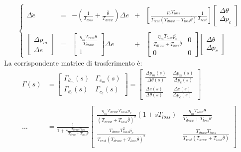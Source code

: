 $$
\left\{
\begin{array}{ccccc}
\Delta\dot{e}&=&-\left(\frac{1}{T_{loss}}+\frac{\overline{\theta}}{T_{draw}}\right)\Delta e&+&\left[\frac{p_c T_{loss}}{T_{rest}(T_{draw}+T_{loss}\overline{\theta})}\frac{1}{T_{rest}}\right]\left[\begin{array}
{c}
\Delta\theta\\
\Delta p_c
\end{array}\right]\\
\\
\left[
\begin{array}{c}
\Delta p_m\\
\Delta e
\end{array}\right] 
& = &
\left[
\begin{array}{c}
\frac{\eta_mT_{rest}\theta}{T_{draw}}\\
1
\end{array}\right]
\Delta e &+&
\left[ 
\begin{array}{cc}
\frac{\eta_mT_{loss}\overline{p_c}}{T_{draw}+T_{loss}\overline{\theta}} & 0 \\
0 & 0
\end{array}\right]\left[
\begin{array}{c}
\Delta\theta\\
\Delta p_c
\end{array}\right]
\end{array}
\right.
$$
La corrispondente matrice di trasferimento è:
$$
\begin{array}{lc}
\Gamma(s) &=\left[\begin{array}{cc}
\Gamma_{\theta_m}(s) & \Gamma_{c_m}(s)\\
\Gamma_{\theta_e}(s) & \Gamma_{c_e}(s)
\end{array}\right]=\left[\begin{array}{cc}
\frac{\Delta p_m(s)}{\Delta\theta(s)} & \frac{\Delta p_m(s)}{\Delta p_c(s)}\\
\frac{\Delta e(s)}{\Delta\theta(s)} & \frac{\Delta e(s)}{\Delta p_c(s)}
\end{array}\right]\\
\\
\dots &= \frac{1}{1+s\frac{T_{draw}T_{loss}}{T_{draw}+T_{loss}\overline{\theta}}}
\left[
\begin{array}{cc}
\frac{\eta_m T_{draw}T_{loss}\overline{p_c}}{(T_{draw}+T_{loss}\overline{\theta})^2}(1+sT_{loss})&
\frac{\eta_mT_{loss}\overline{\theta}}{T_{draw}+T_{loss}\overline{\theta}}\\
\frac{T_{draw}T^2_{loss}\overline{p_c}}{T_{rest}(T_{draw}+T_{loss}\overline{\theta})^2} & 
\frac{T_{draw}T_{loss}}{T_{rest}(T_{draw}+T_{loss}\overline{\theta})}\\
\end{array}
\right]
\end{array}
$$
